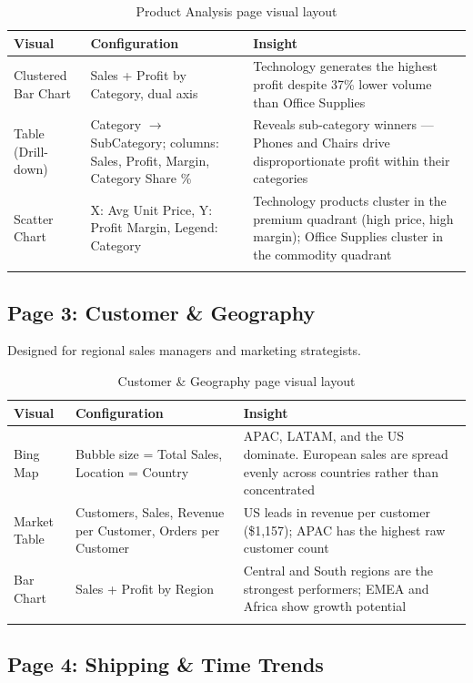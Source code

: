 \documentclass[11pt,a4paper]{article}
\begin{document}
\begin{longtable}{p{3cm} p{5.5cm} p{5.5cm}}
\toprule
\textbf{Visual} & \textbf{Configuration} & \textbf{Insight} \\
\midrule
\endhead
Clustered Bar Chart & Sales + Profit by Category, dual axis & Technology generates the highest profit despite 37\% lower volume than Office Supplies \\
Table (Drill-down) & Category $\to$ SubCategory; columns: Sales, Profit, Margin, Category Share \% & Reveals sub-category winners --- Phones and Chairs drive disproportionate profit within their categories \\
Scatter Chart & X: Avg Unit Price, Y: Profit Margin, Legend: Category & Technology products cluster in the premium quadrant (high price, high margin); Office Supplies cluster in the commodity quadrant \\
\bottomrule
\caption{Product Analysis page visual layout}
\end{longtable}

\subsection{Page 3: Customer \& Geography}

Designed for regional sales managers and marketing strategists.

\begin{longtable}{p{3cm} p{5.5cm} p{5.5cm}}
\toprule
\textbf{Visual} & \textbf{Configuration} & \textbf{Insight} \\
\midrule
\endhead
Bing Map & Bubble size = Total Sales, Location = Country & APAC, LATAM, and the US dominate. European sales are spread evenly across countries rather than concentrated \\
Market Table & Customers, Sales, Revenue per Customer, Orders per Customer & US leads in revenue per customer (\$1,157); APAC has the highest raw customer count \\
Bar Chart & Sales + Profit by Region & Central and South regions are the strongest performers; EMEA and Africa show growth potential \\
\bottomrule
\caption{Customer \& Geography page visual layout}
\end{longtable}

\subsection{Page 4: Shipping \& Time Trends}
\end{document}
